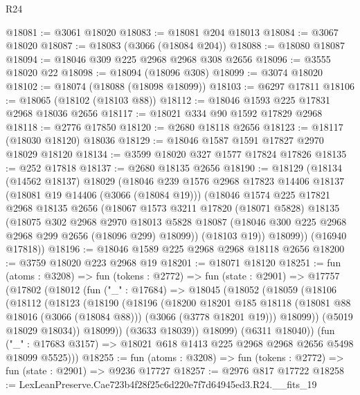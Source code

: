 \begin{lexlean}{R24}
\begin{coremodule}
@18081 := @3061 @18020
@18083 := @18081 @204 @18013
@18084 := @3067 @18020
@18087 := @18083 (@3066 (@18084 @204))
@18088 := @18080 @18087
@18094 := @18046 @309 @225 @2968 @2968 @308 @2656
@18096 := @3555 @18020 @22
@18098 := @18094 (@18096 @308)
@18099 := @3074 @18020
@18102 := @18074 (@18088 (@18098 @18099))
@18103 := @6297 @17811
@18106 := @18065 (@18102 (@18103 @88))
@18112 := @18046 @1593 @225 @17831 @2968 @18036 @2656
@18117 := @18021 @334 @90 @1592 @17829 @2968
@18118 := @2776 @17850
@18120 := @2680 @18118 @2656
@18123 := @18117 (@18030 @18120) @18036
@18129 := @18046 @1587 @1591 @17827 @2970 @18029 @18120
@18134 := @3599 @18020 @327 @1577 @17824 @17826
@18135 := @252 @17818
@18137 := @2680 @18135 @2656
@18190 := @18129
    (@18134
      (@14562 @18137)
      @18029
      (@18046
        @239
        @1576
        @2968
        @17823
        @14406
        @18137
        (@18081 @19 @14406 (@3066 (@18084 @19)))
        (@18046
          @1574
          @225
          @17821
          @2968
          @18135
          @2656
          (@18067
            @1573
            @3211
            @17820
            (@18071 @5828)
            @18135
            (@18075
              @302
              @2968
              @2970
              @18013
              @5828
              @18087
              (@18046 @300 @225 @2968 @2968 @299 @2656 (@18096 @299) @18099))
            (@18103 @19))
          @18099))
      (@16940 @17818))
@18196 := @18046 @1589 @225 @2968 @2968 @18118 @2656
@18200 := @3759 @18020 @223 @2968 @19
@18201 := @18071 @18120
@18251 := fun (atoms : @3208) =>
  fun (tokens : @2772) =>
  fun (state : @2901) =>
  @17757
    (@17802
      (@18012
        (fun ("_" : @17684) =>
        @18045
          (@18052
            (@18059
              (@18106
                (@18112
                  (@18123
                    (@18190
                      (@18196
                        (@18200
                          @18201
                          @185
                          @18118
                          (@18081 @88 @18016 (@3066 (@18084 @88)))
                          (@3066 (@3778 @18201 @19)))
                        @18099))
                    (@5019 @18029 @18034))
                  @18099))
              (@3633 @18039))
            @18099)
          (@6311 @18040))
        (fun ("_" : @17683 @3157) => @18021 @618 @1413 @225 @2968 @2968 @2656 @5498 @18099 @5525)))
@18255 := fun (atoms : @3208) => fun (tokens : @2772) => fun (state : @2901) => @9236 @17727
@18257 := @2976 @817 @17722
@18258 := LexLeanPreserve.Cae723b4f28f25c6d220e7f7d64945ed3.R24.__fits_19

\end{coremodule}
\end{lexlean}
